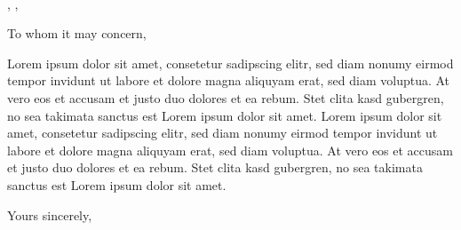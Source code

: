 \documentclass[11pt,a4paper]{letter}
\begin{document}
	
	\longindentation=0pt
	\renewcommand\enclname{Attached}
	
	\begin{letter}{\textbf{\recipient} \\ \tocompany, \tocity, \tocountry}
		\opening{To whom it may concern,}
		
		Lorem ipsum dolor sit amet, consetetur sadipscing elitr, sed diam nonumy eirmod tempor invidunt ut labore et dolore magna aliquyam erat, sed diam voluptua. At vero eos et accusam et justo duo dolores et ea rebum. Stet clita kasd gubergren, no sea takimata sanctus est Lorem ipsum dolor sit amet. Lorem ipsum dolor sit amet, consetetur sadipscing elitr, sed diam nonumy eirmod tempor invidunt ut labore et dolore magna aliquyam erat, sed diam voluptua. At vero eos et accusam et justo duo dolores et ea rebum. Stet clita kasd gubergren, no sea takimata sanctus est Lorem ipsum dolor sit amet.
		
		\closing{Yours sincerely,}

		
	\end{letter}
\end{document}
